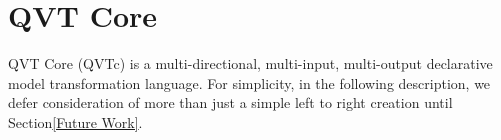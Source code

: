 %
\section{QVT Core}\label{sec:qvtcore}


QVT Core (QVTc) is a multi-directional, multi-input, multi-output declarative model transformation language. For simplicity, in the following description, we defer consideration of more than just a simple left to right creation until Section\ref{Future Work}. 

